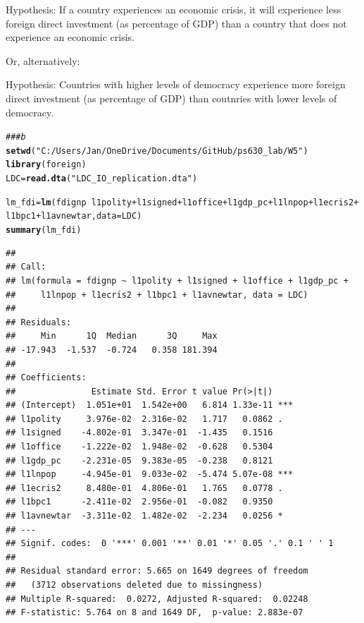 \documentclass[12pt,letter]{article}\usepackage[]{graphicx}\usepackage[]{color}
\makeatletter
\newcommand{\hlstr}[1]{\textcolor[rgb]{0.192,0.494,0.8}{#1}}%
\newcommand{\hlcom}[1]{\textcolor[rgb]{0.678,0.584,0.686}{\textit{#1}}}%
\newcommand{\hlopt}[1]{\textcolor[rgb]{0,0,0}{#1}}%
\newcommand{\hlstd}[1]{\textcolor[rgb]{0.345,0.345,0.345}{#1}}%
\newcommand{\hlkwb}[1]{\textcolor[rgb]{0.69,0.353,0.396}{#1}}%
\newcommand{\hlkwc}[1]{\textcolor[rgb]{0.333,0.667,0.333}{#1}}%
\newcommand{\hlkwd}[1]{\textcolor[rgb]{0.737,0.353,0.396}{\textbf{#1}}}%
\newenvironment{kframe}{%
 \def\at@end@of@kframe{}%
 \ifinner\ifhmode%
  \def\at@end@of@kframe{\end{minipage}}%
  \begin{minipage}{\columnwidth}%
 \fi\fi%
 \def\FrameCommand##1{\hskip\@totalleftmargin \hskip-\fboxsep
 \colorbox{shadecolor}{##1}\hskip-\fboxsep
     \hskip-\linewidth \hskip-\@totalleftmargin \hskip\columnwidth}%
 \MakeFramed {\advance\hsize-\width
   \@totalleftmargin\z@ \linewidth\hsize
   \@setminipage}}%
 {\par\unskip\endMakeFramed%
 \at@end@of@kframe}
\newenvironment{knitrout}{}{} %
\makeatother
\begin{document}
Hypothesis: If a country experiences an economic crisis, it will experience less foreign direct investment (as percentage of GDP) than a country that does not experience an economic crisis.

Or, alternatively:

Hypothesis: Countries with higher levels of democracy experience more foreign direct investment (as percentage of GDP) than coutnries with lower levels of democracy.

\begin{knitrout}
\color{fgcolor}\begin{kframe}
\begin{alltt}
\hlcom{### b}
\hlkwd{setwd}\hlstd{(}\hlstr{"C:/Users/Jan/OneDrive/Documents/GitHub/ps630_lab/W5"}\hlstd{)}
\hlkwd{library}\hlstd{(foreign)}
\hlstd{LDC} \hlkwb{=} \hlkwd{read.dta}\hlstd{(}\hlstr{"LDC_IO_replication.dta"}\hlstd{)}

\hlstd{lm_fdi} \hlkwb{=} \hlkwd{lm}\hlstd{(fdignp} \hlopt{~} \hlstd{l1polity} \hlopt{+} \hlstd{l1signed} \hlopt{+} \hlstd{l1office} \hlopt{+} \hlstd{l1gdp_pc} \hlopt{+} \hlstd{l1lnpop} \hlopt{+} \hlstd{l1ecris2} \hlopt{+}
    \hlstd{l1bpc1} \hlopt{+} \hlstd{l1avnewtar,} \hlkwc{data} \hlstd{= LDC)}
\hlkwd{summary}\hlstd{(lm_fdi)}
\end{alltt}
\begin{verbatim}
## 
## Call:
## lm(formula = fdignp ~ l1polity + l1signed + l1office + l1gdp_pc + 
##     l1lnpop + l1ecris2 + l1bpc1 + l1avnewtar, data = LDC)
## 
## Residuals:
##     Min      1Q  Median      3Q     Max 
## -17.943  -1.537  -0.724   0.358 181.394 
## 
## Coefficients:
##               Estimate Std. Error t value Pr(>|t|)    
## (Intercept)  1.051e+01  1.542e+00   6.814 1.33e-11 ***
## l1polity     3.976e-02  2.316e-02   1.717   0.0862 .  
## l1signed    -4.802e-01  3.347e-01  -1.435   0.1516    
## l1office    -1.222e-02  1.948e-02  -0.628   0.5304    
## l1gdp_pc    -2.231e-05  9.383e-05  -0.238   0.8121    
## l1lnpop     -4.945e-01  9.033e-02  -5.474 5.07e-08 ***
## l1ecris2     8.480e-01  4.806e-01   1.765   0.0778 .  
## l1bpc1      -2.411e-02  2.956e-01  -0.082   0.9350    
## l1avnewtar  -3.311e-02  1.482e-02  -2.234   0.0256 *  
## ---
## Signif. codes:  0 '***' 0.001 '**' 0.01 '*' 0.05 '.' 0.1 ' ' 1
## 
## Residual standard error: 5.665 on 1649 degrees of freedom
##   (3712 observations deleted due to missingness)
## Multiple R-squared:  0.0272,	Adjusted R-squared:  0.02248 
## F-statistic: 5.764 on 8 and 1649 DF,  p-value: 2.883e-07
\end{verbatim}
\end{kframe}
\end{knitrout}
\end{document}
